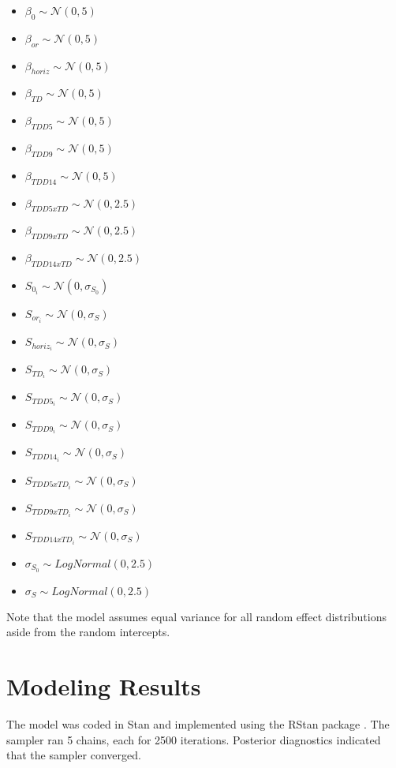 \begin{itemize}
    \item $\beta_{0} \sim \mathcal{N}(0,5)$
    \item $\beta_{or} \sim \mathcal{N}(0,5)$
    \item $\beta_{horiz} \sim \mathcal{N}(0,5)$
    \item $\beta_{TD} \sim \mathcal{N}(0,5)$
    \item $\beta_{TDD5} \sim \mathcal{N}(0,5)$
    \item $\beta_{TDD9} \sim \mathcal{N}(0,5)$
    \item $\beta_{TDD14} \sim \mathcal{N}(0,5)$
    \item $\beta_{TDD5xTD} \sim \mathcal{N}(0,2.5)$
    \item $\beta_{TDD9xTD} \sim \mathcal{N}(0,2.5)$
    \item $\beta_{TDD14xTD} \sim \mathcal{N}(0,2.5)$
    \item $S_{0_{i}} \sim \mathcal{N}(0, \sigma_{S_0})$
    \item $S_{or_{i}} \sim \mathcal{N}(0, \sigma_{S})$
    \item $S_{horiz_{i}} \sim \mathcal{N}(0, \sigma_{S})$
    \item $S_{TD_{i}} \sim \mathcal{N}(0, \sigma_{S})$
    \item $S_{TDD5_{i}} \sim \mathcal{N}(0, \sigma_{S})$
    \item $S_{TDD9_{i}} \sim \mathcal{N}(0, \sigma_{S})$
    \item $S_{TDD14_{i}} \sim \mathcal{N}(0, \sigma_{S})$
    \item $S_{TDD5xTD_{i}} \sim \mathcal{N}(0, \sigma_{S})$
    \item $S_{TDD9xTD_{i}} \sim \mathcal{N}(0, \sigma_{S})$
    \item $S_{TDD14xTD_{i}} \sim \mathcal{N}(0, \sigma_{S})$
    \item $\sigma_{S_{0}} \sim LogNormal(0,2.5)$
    \item $\sigma_{S} \sim LogNormal(0,2.5)$
\end{itemize}

Note that the model assumes equal variance for all random effect distributions aside from the random intercepts.

\section{Modeling Results}
The model was coded in Stan \parencite{carpenter2017stan} and implemented using the RStan package \parencite{rstan}. The sampler ran 5 chains, each for 2500 iterations. Posterior diagnostics indicated that the sampler converged.

